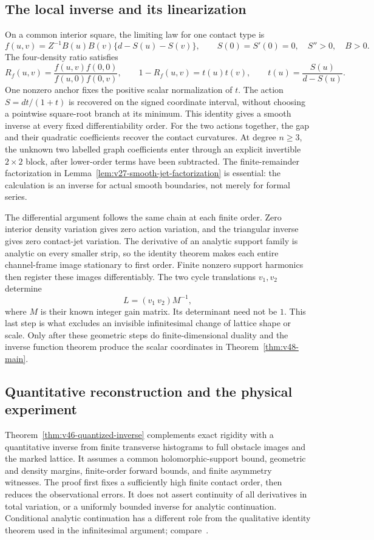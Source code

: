 \subsection{The local inverse and its linearization}

On a common interior square, the limiting law for one contact type is
\[
 f(u,v)=Z^{-1}B(u)B(v)\{d-S(u)-S(v)\},\qquad
 S(0)=S'(0)=0,\quad S''>0,\quad B>0.
\]
The four-density ratio satisfies
\[
 R_f(u,v)=\frac{f(u,v)f(0,0)}{f(u,0)f(0,v)},\qquad
 1-R_f(u,v)=t(u)t(v),\qquad t(u)=\frac{S(u)}{d-S(u)}.
\]
One nonzero anchor fixes the positive scalar normalization of $t$.
The action $S=dt/(1+t)$ is recovered on the signed coordinate interval,
without choosing a pointwise square-root branch at its minimum.  This
identity gives a smooth inverse at every fixed differentiability order.
For the two actions together, the gap and their quadratic coefficients
recover the contact curvatures.  At degree $n\ge3$, the unknown two
labelled graph coefficients enter through an explicit invertible
$2\times2$ block, after lower-order terms have been subtracted.  The
finite-remainder factorization in
Lemma~\ref{lem:v27-smooth-jet-factorization} is essential: the calculation
is an inverse for actual smooth boundaries, not merely for formal series.

The differential argument follows the same chain at each finite order.
Zero interior density variation gives zero action variation, and the
triangular inverse gives zero contact-jet variation.  The derivative of
an analytic support family is analytic on every smaller strip, so the
identity theorem makes each entire channel-frame image stationary to
first order.  Finite nonzero support harmonics then register these
images differentiably.  The two cycle translations $v_1,v_2$ determine
\[
                     L=(v_1\ v_2)M^{-1},
\]
where $M$ is their known integer gain matrix.  Its determinant need not
be $1$.  This last step is what excludes an invisible infinitesimal
change of lattice shape or scale.  Only after these geometric steps do
finite-dimensional duality and the inverse function theorem produce the
scalar coordinates in Theorem~\ref{thm:v48-main}.

\subsection{Quantitative reconstruction and the physical experiment}

Theorem~\ref{thm:v46-quantized-inverse} complements exact rigidity with a
quantitative inverse from finite transverse histograms to full obstacle
images and the marked lattice.  It assumes a common holomorphic-support
bound, geometric and density margins, finite-order forward bounds, and
finite asymmetry witnesses.  The proof first fixes a sufficiently high
finite contact order, then reduces the observational errors.  It does
not assert continuity of all derivatives in total variation, or a
uniformly bounded inverse for analytic continuation.  Conditional analytic
continuation has a different role from the qualitative identity theorem
used in the infinitesimal argument; compare~\cite{Trefethen2020}.

